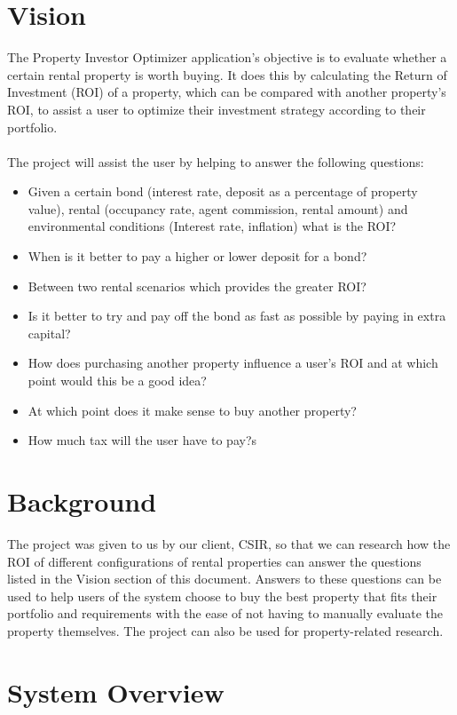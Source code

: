 \documentclass[a4paper,12pt]{article}
\begin{document}
\section{Vision}
The Property Investor Optimizer application's objective is to evaluate whether a certain rental property is worth buying. It does this by calculating the Return of Investment (ROI) of a property, which can be compared with another property's ROI, to assist a user to optimize their investment strategy according to their portfolio.\\\\
The project will assist the user by helping to answer the following questions:\begin{itemize}
	\item Given a certain bond (interest rate, deposit as a percentage of property value), rental (occupancy rate, agent commission, rental amount) and environmental conditions (Interest rate, inflation) what is the ROI?
	\item When is it better to pay a higher or lower deposit for a bond?
	\item Between two rental scenarios which provides the greater ROI?
	\item Is it better to try and pay off the bond as fast as possible by paying in extra capital?
	\item How does purchasing another property influence a user's ROI and at which point would this be a good idea?
	\item At which point does it make sense to buy another property?
	\item How much tax will the user have to pay?s

\end{itemize}

\section{Background}
The project was given to us by our client, CSIR, so that we can research how the ROI of different configurations of rental properties can answer the questions listed in the Vision section of this document. Answers to these questions can be used to help users of the system choose to buy the best property that fits their portfolio and requirements with the ease of not having to manually evaluate the property themselves. The project can also be used for property-related research.


\section{System Overview}
\end{document}
